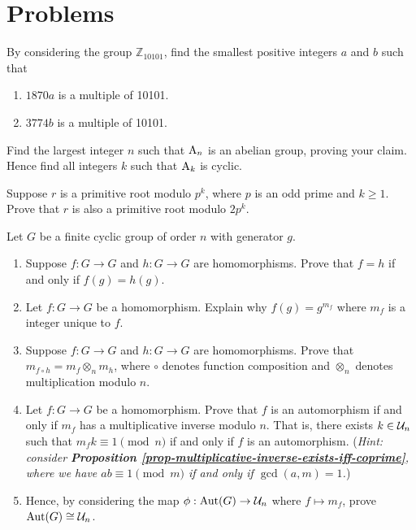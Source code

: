 \newpage

\section{Problems}
\begin{problem}
    By considering the group $\mathbb{Z}_{10101}$, find the smallest positive integers $a$ and $b$ such that
    \begin{enumerate}[label=(\alph*)]
        \item $1870a$ is a multiple of 10101.
        \item $3774b$ is a multiple of 10101.
    \end{enumerate}
\end{problem}

\begin{problem}
    Find the largest integer $n$ such that $\mathrm{A}_{n}$ is an abelian group, proving your claim. Hence find all integers $k$ such that $\mathrm{A}_{k}$ is cyclic.
\end{problem}

\begin{problem}
    Suppose $r$ is a primitive root modulo $p^k$, where $p$ is an odd prime and $k \geq 1$. Prove that $r$ is also a primitive root modulo $2p^k$.
\end{problem}

\begin{problem}
    Let $G$ be a finite cyclic group of order $n$ with generator $g$.
    \begin{enumerate}[label=(\roman*)]
        \item Suppose $f: G \to G$ and $h: G \to G$ are homomorphisms. Prove that $f = h$ if and only if $f(g) = h(g)$.
        \item Let $f: G \to G$ be a homomorphism. Explain why $f(g) = g^{m_f}$ where $m_f$ is a integer unique to $f$.
        \item Suppose $f: G \to G$ and $h: G \to G$ are homomorphisms. Prove that $m_{f\circ h} = m_f \otimes_n m_h$, where $\circ$ denotes function composition and $\otimes_n$ denotes multiplication modulo $n$.
        \item Let $f: G \to G$ be a homomorphism. Prove that $f$ is an automorphism if and only if $m_f$ has a multiplicative inverse modulo $n$. That is, there exists $k \in \mathcal{U}_{n}$ such that $m_fk \equiv 1 \pmod n$ if and only if $f$ is an automorphism.\newline
        (\textit{Hint: consider \textbf{Proposition \ref{prop-multiplicative-inverse-exists-iff-coprime}}, where we have $ab \equiv 1 \pmod m$ if and only if $\gcd(a, m) = 1$.})
        \item Hence, by considering the map $\phi: \mathrm{Aut}(G) \to \mathcal{U}_{n}$ where $f \mapsto m_f$, prove $\mathrm{Aut}(G) \cong \mathcal{U}_{n}$. 
    \end{enumerate}
\end{problem}

